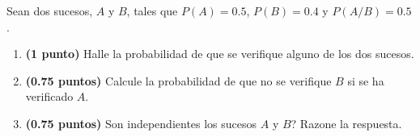 
Sean dos sucesos, $A$ y $B$, tales que $P(A)=0.5$, $P(B)=0.4$ y $P(A/B)=0.5$.
\begin{enumerate}[label=\alph*)]
\item \textbf{(1 punto)} Halle la probabilidad de que se verifique alguno de los dos sucesos.
\item \textbf{(0.75 puntos)} Calcule la probabilidad de que no se verifique $B$ si se ha verificado $A$.
\item \textbf{(0.75 puntos)} \textquestiondown{}Son independientes los sucesos $A$ y $B$? Razone la respuesta.
\end{enumerate}

